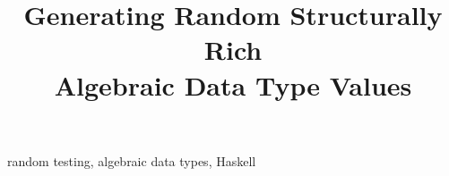 \documentclass[conference, fleqn]{IEEEtran}
\begin{document}
\title{Generating Random Structurally Rich \\ Algebraic Data Type Values}

\author{
\and
{}
}

\maketitle


\newenvironment{CompactItemize}%
  {\begin{list}{$\, \  \blacktriangleright$}%
   {\leftmargin=0pt \itemsep=2pt \topsep=5pt
     \parsep=0pt \partopsep=0pt}}%
  {\end{list}}




\begin{IEEEkeywords}
random testing, algebraic data types, Haskell
\end{IEEEkeywords}













\end{document}
